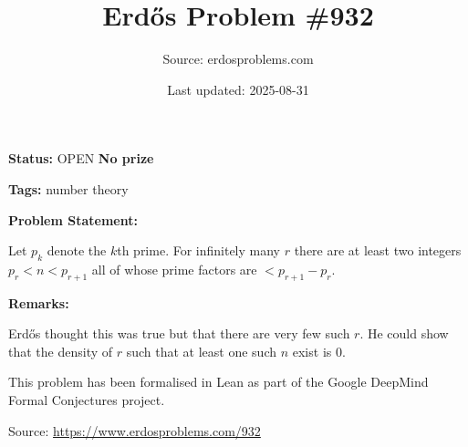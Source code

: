 \documentclass{article}
\title{Erd\H{o}s Problem \#932}
\date{Last updated: 2025-08-31}
\author{Source: erdosproblems.com}
\begin{document}
\maketitle

\noindent\textbf{Status:} OPEN \quad \textbf{No prize}

\noindent\textbf{Tags:} number theory

\medskip
\noindent\textbf{Problem Statement:}

Let $p_k$ denote the $k$th prime. For infinitely many $r$ there are at least two integers $p_r<n<p_{r+1}$ all of whose prime factors are $<p_{r+1}-p_r$.

\bigskip
\noindent\textbf{Remarks:}

Erd\H{o}s thought this was true but that there are very few such $r$. He could show that the density of $r$ such that at least one such $n$ exist is $0$. 

This problem has been formalised in Lean as part of the Google DeepMind Formal Conjectures project.

\bigskip
\noindent\small{Source: \url{https://www.erdosproblems.com/932}}
\end{document}
